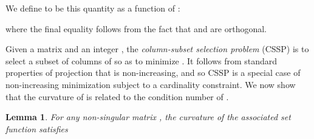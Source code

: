 \documentclass{article}
\newtheorem{lemma}[theorem]{Lemma}
\theoremstyle{definition}
\begin{document}
We define  to be this quantity as a function of :

where the final equality follows from the fact that  and  are orthogonal.

\iffalse
In the following lemma, we show that the function  is a monotone increasing submodular function of .  It then follows that  is a monotone decreasing supermodular function.
\begin{lemma}
\label{lem:proj-submod}
Let  be a set of vectors in , and let  be an arbitrary vector in .  Then, the function  is monotone increasing and submodular.
\end{lemma}
\begin{proof}
Monotonicity follows from the standard properties of projection.  To prove submodularity, let , and let  and  be two values in .  It suffices to show that for any :

To simplify our notation, let  and .  Note that if , then both sides of the inequality are 0, and if  both sides are equal.  Suppose, then, that neither  nor  are in , and let .  Then,

Now, let  and .  Then, we have

Now, set the quantity  if  and  otherwise.  Then,

Hence,

\end{proof}
\fi

Given a matrix  and an integer , the \emph{column-subset selection problem} (CSSP) is to select a subset  of  columns of  so as to minimize .
It follows from standard properties of projection that  is non-increasing, and so CSSP is a special case of non-increasing minimization subject to a cardinality constraint.  We now show that the curvature of  is related to the condition number of .

\begin{lemma}
\label{lem:condition-curvature}
For any non-singular matrix , the curvature 
of the associated set function  satisfies 

\end{lemma}
\end{document}
